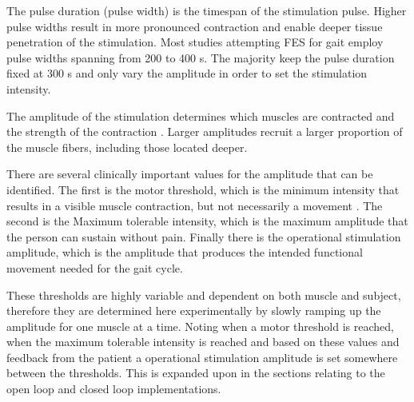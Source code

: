 The pulse duration (pulse width) is the timespan of the stimulation pulse. Higher pulse widths result in more pronounced contraction and enable deeper tissue penetration of the stimulation. Most studies attempting FES for gait employ pulse widths spanning from 200 to 400 \micro s. The majority keep the pulse duration fixed at 300 \micro s and only vary the amplitude in order to set the stimulation intensity.\cite{aout_effects_2023}

The amplitude of the stimulation determines which muscles are contracted and the strength of the contraction \cite{marquez-chin_functional_2020}. Larger amplitudes recruit a larger proportion of the muscle fibers, including those located deeper. 

There are several clinically important values for the amplitude that can be identified. The first is the motor threshold, which is the minimum intensity  that results in a visible muscle contraction, but not necessarily a movement \cite{marquez-chin_functional_2020}. The second is the Maximum tolerable intensity, which is the maximum amplitude that the person can sustain without pain. Finally there is the operational stimulation amplitude, which is the amplitude that produces the intended functional movement needed for the gait cycle. 

These thresholds are highly variable and dependent on both muscle and subject, therefore they are determined here experimentally by slowly ramping up the amplitude for one muscle at a time. Noting when a motor threshold is reached, when the maximum tolerable intensity is reached and based on these values and feedback from the patient a operational stimulation amplitude is set somewhere between the thresholds. This is expanded upon in the sections relating to the open loop and closed loop implementations.


